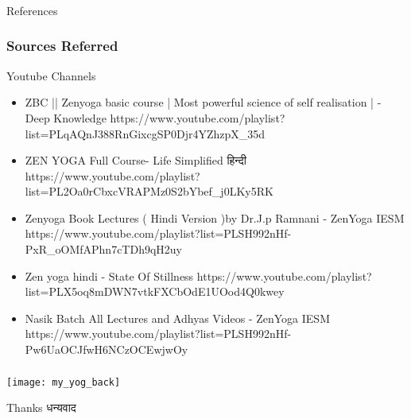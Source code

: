\begin{frame}[fragile]\frametitle{}
\begin{center}
{\Large References}
\end{center}
\end{frame}


\begin{frame}[fragile]\frametitle{Sources Referred}

Youtube Channels

	\begin{itemize}
	\item ZBC || Zenyoga basic course | Most powerful science of self realisation | - Deep Knowledge https://www.youtube.com/playlist?list=PLqAQnJ388RnGixcgSP0Djr4YZhzpX\_35d
	\item ZEN YOGA Full Course-  Life Simplified हिन्दी https://www.youtube.com/playlist?list=PL2Oa0rCbxcVRAPMz0S2bYbef_j0LKy5RK
	\item Zenyoga Book Lectures ( Hindi Version )by Dr.J.p Ramnani -  ZenYoga IESM https://www.youtube.com/playlist?list=PLSH992nHf-PxR_oOMfAPhn7cTDh9qH2uy
	\item Zen yoga hindi - State Of Stillness https://www.youtube.com/playlist?list=PLX5oq8mDWN7vtkFXCbOdE1UOod4Q0kwey
	\item Nasik Batch All Lectures and Adhyas Videos - ZenYoga IESM https://www.youtube.com/playlist?list=PLSH992nHf-Pw6UaOCJfwH6NCzOCEwjwOy
	\end{itemize}

\end{frame}

\begin{frame}[fragile]\frametitle{}

\begin{center}
\texttt{[image: my\_yog\_back]}

Thanks धन्यवाद
\end{center}

\end{frame}
